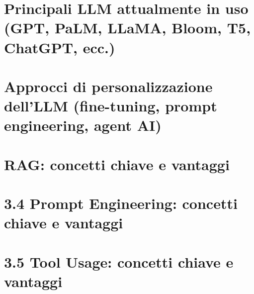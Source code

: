 \section{Principali LLM attualmente in uso (GPT, PaLM, LLaMA, Bloom, T5, ChatGPT, ecc.)}
\section{Approcci di personalizzazione dell'LLM (fine-tuning, prompt engineering, agent AI)}
\section{RAG: concetti chiave e vantaggi}
\section{3.4 Prompt Engineering: concetti chiave e vantaggi}
\section{3.5 Tool Usage: concetti chiave e vantaggi}